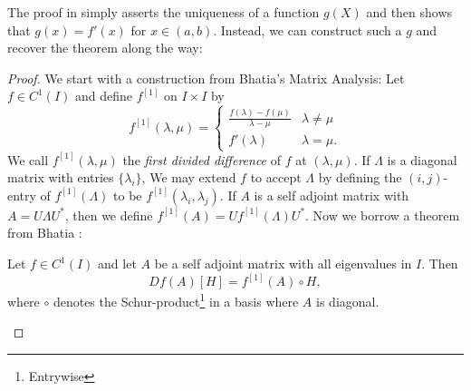 The proof in \cite{pascoeTrace2020} simply asserts the uniqueness of a function
\(g(X)\) and then shows that \(g(x)=f'(x)\) for \(x \in (a,b)\). Instead, we can
construct such a \(g\) and recover the theorem along the way:
\begin{proof}

We start with a construction from Bhatia's Matrix Analysis: Let
$f \in C ^{1} (I)$ and define $f ^{[1]} $ on $I \times I$ by
\[
  f^{[1]} (\lambda,\mu) =
  \begin{cases}
    \frac{f(\lambda) - f(\mu)}{\lambda-\mu} & \lambda \neq \mu \\
    f'(\lambda) & \lambda = \mu.
  \end{cases}
\]
We call $f ^{[1]} (\lambda,\mu)$ the \emph{first divided difference} of $f$ at
$(\lambda,\mu)$. If $\Lambda$ is a diagonal matrix with entries
$\{ \lambda_{i}\} $, We may extend $f$ to accept $\Lambda$ by
defining the $(i,j)$-entry of $f ^{[1]} (\Lambda)$ to be
$f ^{[1]} (\lambda_i,\lambda_j)$. If $A$ is a self adjoint matrix with
$A = U \Lambda U ^{*} $, then we define
$f ^{[1]} (A) = U f ^{[1]} (\Lambda) U ^{*} $. Now we borrow a theorem from
Bhatia \cite{bhatiaMatrixAnalysis1997}:
\begin{theorem}[Bhatia V.3.3]
  Let $f \in C ^{1} (I)$ and let $A$ be a self adjoint matrix with all
  eigenvalues in $I$. Then \[
    Df(A)[H] = f ^{[1]} (A) \circ H,
  \]
  where $\circ$ denotes the Schur-product\footnote{Entrywise} in a basis where $A$ is diagonal.
\end{theorem}


\end{proof}
